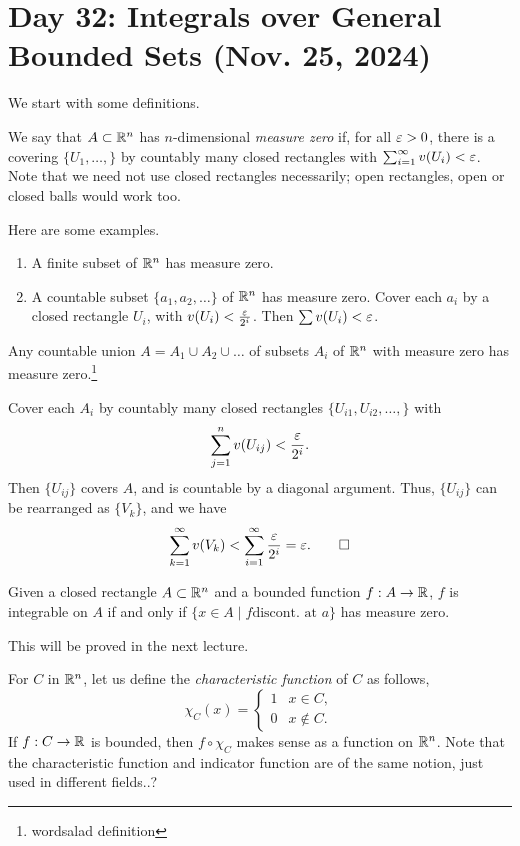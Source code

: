 \section{Day 32: Integrals over General Bounded Sets (Nov. 25, 2024)}
We start with some definitions.
\begin{definition}
    We say that $A \subset \mathbb R^n$ has $n$-dimensional \textit{measure zero} if, for all $\varepsilon > 0$, there is a covering $\{U_1, \dots, \}$ by countably many closed rectangles with $\sum_{i=1}^\infty v(U_i) < \varepsilon$. Note that we need not use closed rectangles necessarily; open rectangles, open or closed balls would work too.
\end{definition}
\noindent Here are some examples.
\begin{enumerate}[label=(\alph*)]
    \item A finite subset of $\mathbb R^n$ has measure zero.
    \item A countable subset $\{a_1, a_2, \dots \}$ of $\mathbb R^n$ has measure zero. Cover each $a_i$ by a closed rectangle $U_i$, with $v(U_i) < \frac{\varepsilon}{2^i}$. Then $\sum v(U_i) < \varepsilon$.
\end{enumerate}
\begin{simplelemma}
    Any countable union $A = A_1 \cup A_2 \cup \dots$ of subsets $A_i$ of $\mathbb R^n$ with measure zero has measure zero.\footnote{wordsalad definition}
\end{simplelemma}
Cover each $A_i$ by countably many closed rectangles $\{U_{i1}, U_{i2}, \dots, \}$ with
\[ \sum_{j=1}^n v(U_{ij}) < \frac{\varepsilon}{2^i}. \]
Then $\{U_{ij}\}$ covers $A$, and is countable by a diagonal argument. Thus, $\{U_{ij}\}$ can be rearranged as $\{V_k\}$, and we have
\[ \sum_{k=1}^\infty v(V_k) < \sum_{i=1}^\infty \frac{\varepsilon}{2^i} = \varepsilon. \qed \] 
\begin{simplethm}
    Given a closed rectangle $A \subset \mathbb R^n$ and a bounded function $f : A \to \mathbb R$, $f$ is integrable on $A$ if and only if $\{x \in A \mid f \text{discont. at } a\}$ has measure zero.
\end{simplethm}
\noindent This will be proved in the next lecture.
\medskip\newline
\begin{definition}
    For $C$ in $\mathbb R^n$, let us define the \textit{characteristic function} of $C$ as follows,
    \[ \chi_C (x) = \begin{cases} 1 & x \in C, \\ 0 & x \not\in C. \end{cases} \]
    If $f : C \to \mathbb R$ is bounded, then $f \circ \chi_C$ makes sense as a function on $\mathbb R^n$. Note that the characteristic function and indicator function are of the same notion, just used in different fields..?
\end{definition}
